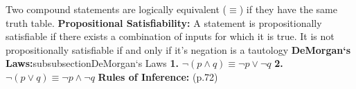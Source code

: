 \documentclass{article}
\newcommand{\upspace}{\vspace{0px}}
\newcommand{\bksp}{\hspace{-3px}}
\newcommand{\zza}[1]{\upspace \1\bksp\textbf{#1:}{subsubsection}{#1}}
\newcommand{\aaa}{\upspace \1\bksp}
\newcommand{\bbb}{\upspace \2\bksp}
\newcommand{\tbf}[1]{\textbf{#1}}
\begin{document}
\begin{multicols*}{2}
\begin{outline}[compactitem]
	\aaa Two compound statements are logically equivalent ($\equiv$) if they have the same truth table.
	\aaa \tbf{Propositional Satisfiability:} A statement is propositionally satisfiable if there exists a combination of inputs for which it is true. It is not propositionally satisfiable if and only if it's negation is a tautology
	\zza{DeMorgan`s Laws}
		\bbb \tbf{1.} $ \neg(p \wedge q) \equiv \neg p \vee \neg q $
		\bbb \tbf{2.} $ \neg(p \vee q) \equiv \neg p \wedge \neg q $
	\aaa \tbf{Rules of Inference:} \hfill (p.72) \\

\end{outline}
\end{multicols*}
\end{document}
